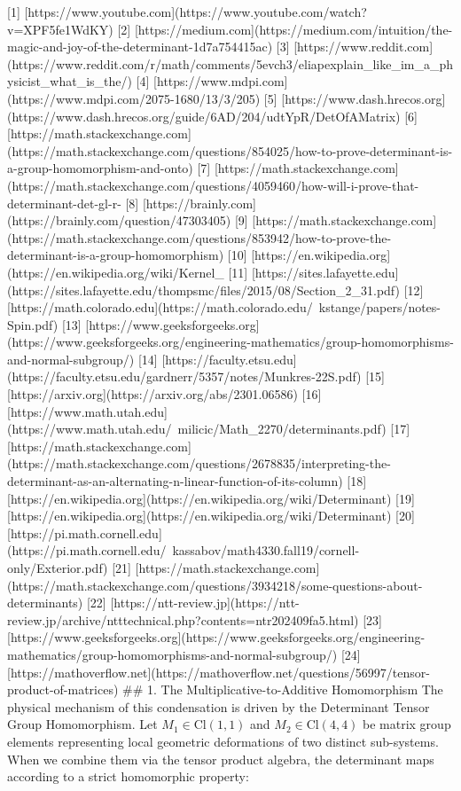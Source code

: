 [1] [https://www.youtube.com](https://www.youtube.com/watch?v=XPF5fe1WdKY)
[2] [https://medium.com](https://medium.com/intuition/the-magic-and-joy-of-the-determinant-1d7a754415ac)
[3] [https://www.reddit.com](https://www.reddit.com/r/math/comments/5evch3/eliapexplain_like_im_a_physicist_what_is_the/)
[4] [https://www.mdpi.com](https://www.mdpi.com/2075-1680/13/3/205)
[5] [https://www.dash.hrecos.org](https://www.dash.hrecos.org/guide/6AD/204/udtYpR/DetOfAMatrix)
[6] [https://math.stackexchange.com](https://math.stackexchange.com/questions/854025/how-to-prove-determinant-is-a-group-homomorphism-and-onto)
[7] [https://math.stackexchange.com](https://math.stackexchange.com/questions/4059460/how-will-i-prove-that-determinant-det-gl-r-%
[8] [https://brainly.com](https://brainly.com/question/47303405)
[9] [https://math.stackexchange.com](https://math.stackexchange.com/questions/853942/how-to-prove-the-determinant-is-a-group-homomorphism)
[10] [https://en.wikipedia.org](https://en.wikipedia.org/wiki/Kernel_%
[11] [https://sites.lafayette.edu](https://sites.lafayette.edu/thompsmc/files/2015/08/Section_2_31.pdf)
[12] [https://math.colorado.edu](https://math.colorado.edu/~kstange/papers/notes-Spin.pdf)
[13] [https://www.geeksforgeeks.org](https://www.geeksforgeeks.org/engineering-mathematics/group-homomorphisms-and-normal-subgroup/)
[14] [https://faculty.etsu.edu](https://faculty.etsu.edu/gardnerr/5357/notes/Munkres-22S.pdf)
[15] [https://arxiv.org](https://arxiv.org/abs/2301.06586)
[16] [https://www.math.utah.edu](https://www.math.utah.edu/~milicic/Math_2270/determinants.pdf)
[17] [https://math.stackexchange.com](https://math.stackexchange.com/questions/2678835/interpreting-the-determinant-as-an-alternating-n-linear-function-of-its-column)
[18] [https://en.wikipedia.org](https://en.wikipedia.org/wiki/Determinant)
[19] [https://en.wikipedia.org](https://en.wikipedia.org/wiki/Determinant)
[20] [https://pi.math.cornell.edu](https://pi.math.cornell.edu/~kassabov/math4330.fall19/cornell-only/Exterior.pdf)
[21] [https://math.stackexchange.com](https://math.stackexchange.com/questions/3934218/some-questions-about-determinants)
[22] [https://ntt-review.jp](https://ntt-review.jp/archive/ntttechnical.php?contents=ntr202409fa5.html)
[23] [https://www.geeksforgeeks.org](https://www.geeksforgeeks.org/engineering-mathematics/group-homomorphisms-and-normal-subgroup/)
[24] [https://mathoverflow.net](https://mathoverflow.net/questions/56997/tensor-product-of-matrices)
## 1. The Multiplicative-to-Additive Homomorphism
The physical mechanism of this condensation is driven by the Determinant Tensor Group Homomorphism. Let $M_1 \in \text{Cl}(1,1)$ and $M_2 \in \text{Cl}(4,4)$ be matrix group elements representing local geometric deformations of two distinct sub-systems. When we combine them via the tensor product algebra, the determinant maps according to a strict homomorphic property:
